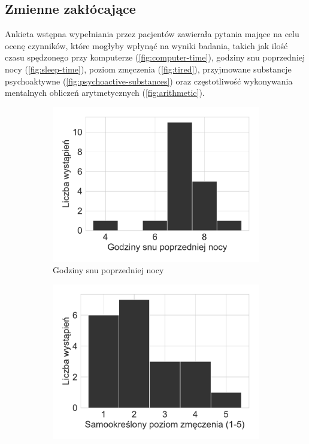 \documentclass{./assets/wfis}
\begin{document}
\subsection{Zmienne zakłócające}\label{zmiennne-zaklucajace}
Ankieta wstępna wypełniania przez pacjentów zawierała pytania mające na celu ocenę czynników, które mogłyby wpłynąć na wyniki badania, takich jak ilość czasu spędzonego przy komputerze (\autoref{fig:computer-time}), godziny snu poprzedniej nocy (\autoref{fig:sleep-time}), poziom zmęczenia (\autoref{fig:tired}), przyjmowane substancje psychoaktywne (\autoref{fig:psychoactive-substances}) oraz częstotliwość wykonywania mentalnych obliczeń arytmetycznych (\autoref{fig:arithmetic}).

\begin{figure}[h!]
\begin{subfigure}[b]{0.45\textwidth}
    \centering
    \includegraphics[width=\columnwidth]{thesis/plots/sleep.pdf}
    \caption{Godziny snu poprzedniej nocy}
    \label{fig:sleep-time}
\end{subfigure}   
\hfill
\begin{subfigure}[b]{0.45\textwidth}
    \centering
    \includegraphics[width=\columnwidth]{thesis/plots/exhaustion_level.pdf}

\end{subfigure}
\end{figure}
\end{document}
